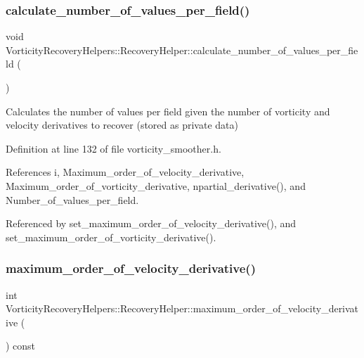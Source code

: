 \subsubsection{\texorpdfstring{calculate\+\_\+number\+\_\+of\+\_\+values\+\_\+per\+\_\+field()}{calculate\_number\_of\_values\_per\_field()}}
{\footnotesize\ttfamily void Vorticity\+Recovery\+Helpers\+::\+Recovery\+Helper\+::calculate\+\_\+number\+\_\+of\+\_\+values\+\_\+per\+\_\+field (\begin{DoxyParamCaption}{ }\end{DoxyParamCaption})\hspace{0.3cm}{\ttfamily [inline]}}



Calculates the number of values per field given the number of vorticity and velocity derivatives to recover (stored as private data) 



Definition at line 132 of file vorticity\+\_\+smoother.\+h.



References i, Maximum\+\_\+order\+\_\+of\+\_\+velocity\+\_\+derivative, Maximum\+\_\+order\+\_\+of\+\_\+vorticity\+\_\+derivative, npartial\+\_\+derivative(), and Number\+\_\+of\+\_\+values\+\_\+per\+\_\+field.



Referenced by set\+\_\+maximum\+\_\+order\+\_\+of\+\_\+velocity\+\_\+derivative(), and set\+\_\+maximum\+\_\+order\+\_\+of\+\_\+vorticity\+\_\+derivative().

\mbox{\label{classVorticityRecoveryHelpers_1_1RecoveryHelper_a315b1e8dee15b91e356d9e13de992b1f}} 
\subsubsection{\texorpdfstring{maximum\+\_\+order\+\_\+of\+\_\+velocity\+\_\+derivative()}{maximum\_order\_of\_velocity\_derivative()}}
{\footnotesize\ttfamily int Vorticity\+Recovery\+Helpers\+::\+Recovery\+Helper\+::maximum\+\_\+order\+\_\+of\+\_\+velocity\+\_\+derivative (\begin{DoxyParamCaption}{ }\end{DoxyParamCaption}) const\hspace{0.3cm}{\ttfamily [inline]}}



